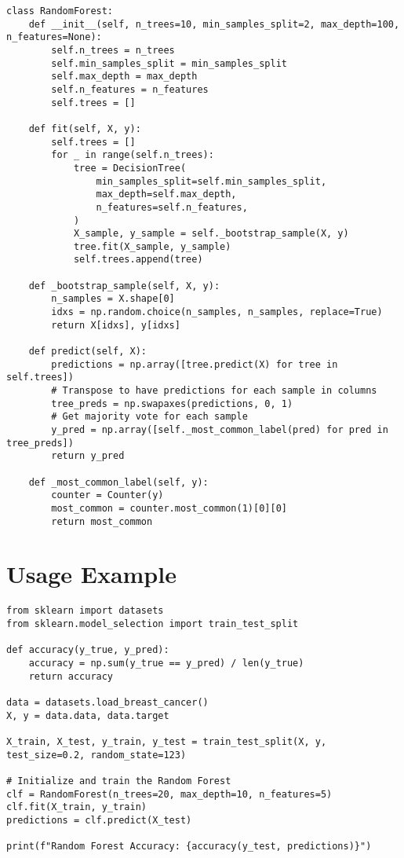 \documentclass[12pt,a4paper]{article}
\begin{document}
\begin{lstlisting}
class RandomForest:
    def __init__(self, n_trees=10, min_samples_split=2, max_depth=100, n_features=None):
        self.n_trees = n_trees
        self.min_samples_split = min_samples_split
        self.max_depth = max_depth
        self.n_features = n_features
        self.trees = []

    def fit(self, X, y):
        self.trees = []
        for _ in range(self.n_trees):
            tree = DecisionTree(
                min_samples_split=self.min_samples_split,
                max_depth=self.max_depth,
                n_features=self.n_features,
            )
            X_sample, y_sample = self._bootstrap_sample(X, y)
            tree.fit(X_sample, y_sample)
            self.trees.append(tree)

    def _bootstrap_sample(self, X, y):
        n_samples = X.shape[0]
        idxs = np.random.choice(n_samples, n_samples, replace=True)
        return X[idxs], y[idxs]

    def predict(self, X):
        predictions = np.array([tree.predict(X) for tree in self.trees])
        # Transpose to have predictions for each sample in columns
        tree_preds = np.swapaxes(predictions, 0, 1)
        # Get majority vote for each sample
        y_pred = np.array([self._most_common_label(pred) for pred in tree_preds])
        return y_pred

    def _most_common_label(self, y):
        counter = Counter(y)
        most_common = counter.most_common(1)[0][0]
        return most_common
\end{lstlisting}

\section{Usage Example}

\begin{lstlisting}
from sklearn import datasets
from sklearn.model_selection import train_test_split

def accuracy(y_true, y_pred):
    accuracy = np.sum(y_true == y_pred) / len(y_true)
    return accuracy

data = datasets.load_breast_cancer()
X, y = data.data, data.target

X_train, X_test, y_train, y_test = train_test_split(X, y, test_size=0.2, random_state=123)

# Initialize and train the Random Forest
clf = RandomForest(n_trees=20, max_depth=10, n_features=5)
clf.fit(X_train, y_train)
predictions = clf.predict(X_test)

print(f"Random Forest Accuracy: {accuracy(y_test, predictions)}")
\end{lstlisting}
\end{document}
